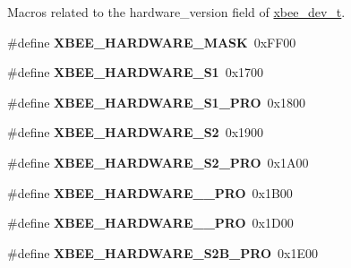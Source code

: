 \label{_amgrp01747264fe7bf50731df0522c351974e}%
Macros related to the {\ttfamily hardware\-\_\-version} field of \hyperlink{structxbee__dev__t}{xbee\-\_\-dev\-\_\-t}. \begin{DoxyCompactItemize}
\item 
\hypertarget{group__xbee__device_ga30868ac420d74847abdb02bb3b53f0ca}{\#define {\bfseries X\-B\-E\-E\-\_\-\-H\-A\-R\-D\-W\-A\-R\-E\-\_\-\-M\-A\-S\-K}~0x\-F\-F00}\label{group__xbee__device_ga30868ac420d74847abdb02bb3b53f0ca}

\item 
\hypertarget{group__xbee__device_ga619703ca20c7f3cafe06387c97960f97}{\#define {\bfseries X\-B\-E\-E\-\_\-\-H\-A\-R\-D\-W\-A\-R\-E\-\_\-\-S1}~0x1700}\label{group__xbee__device_ga619703ca20c7f3cafe06387c97960f97}

\item 
\hypertarget{group__xbee__device_gaa71ee41dab497b298098f09c078389bf}{\#define {\bfseries X\-B\-E\-E\-\_\-\-H\-A\-R\-D\-W\-A\-R\-E\-\_\-\-S1\-\_\-\-P\-R\-O}~0x1800}\label{group__xbee__device_gaa71ee41dab497b298098f09c078389bf}

\item 
\hypertarget{group__xbee__device_ga77c2abc2a2b981882611bcd2304b04b9}{\#define {\bfseries X\-B\-E\-E\-\_\-\-H\-A\-R\-D\-W\-A\-R\-E\-\_\-\-S2}~0x1900}\label{group__xbee__device_ga77c2abc2a2b981882611bcd2304b04b9}

\item 
\hypertarget{group__xbee__device_ga7ac5ee1f16299178b097d77f6090c426}{\#define {\bfseries X\-B\-E\-E\-\_\-\-H\-A\-R\-D\-W\-A\-R\-E\-\_\-\-S2\-\_\-\-P\-R\-O}~0x1\-A00}\label{group__xbee__device_ga7ac5ee1f16299178b097d77f6090c426}

\item 
\hypertarget{group__xbee__device_gad02abeef1b5630075c6f9b1f8d9ebe6e}{\#define {\bfseries X\-B\-E\-E\-\_\-\-H\-A\-R\-D\-W\-A\-R\-E\-\_\-\_\-\-P\-R\-O}~0x1\-B00}\label{group__xbee__device_gad02abeef1b5630075c6f9b1f8d9ebe6e}

\item 
\hypertarget{group__xbee__device_ga0bd900693a71cd8b6f9a26b730791712}{\#define {\bfseries X\-B\-E\-E\-\_\-\-H\-A\-R\-D\-W\-A\-R\-E\-\_\-\_\-\-P\-R\-O}~0x1\-D00}\label{group__xbee__device_ga0bd900693a71cd8b6f9a26b730791712}

\item 
\hypertarget{group__xbee__device_gabe497a567ff238bd15cfd0f1d8e87a80}{\#define {\bfseries X\-B\-E\-E\-\_\-\-H\-A\-R\-D\-W\-A\-R\-E\-\_\-\-S2\-B\-\_\-\-P\-R\-O}~0x1\-E00}\label{group__xbee__device_gabe497a567ff238bd15cfd0f1d8e87a80}


\end{DoxyCompactItemize}
